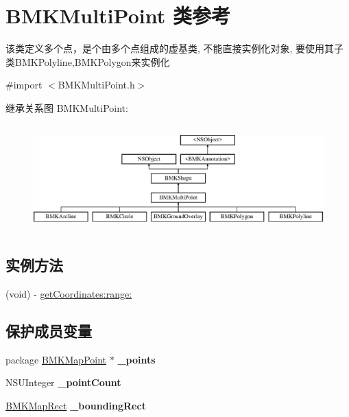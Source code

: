 \hypertarget{interface_b_m_k_multi_point}{\section{B\-M\-K\-Multi\-Point 类参考}
\label{interface_b_m_k_multi_point}
}


该类定义多个点，是个由多个点组成的虚基类, 不能直接实例化对象, 要使用其子类\-B\-M\-K\-Polyline,B\-M\-K\-Polygon来实例化  




{\ttfamily \#import $<$B\-M\-K\-Multi\-Point.\-h$>$}

继承关系图 B\-M\-K\-Multi\-Point\-:\begin{figure}[H]
\begin{center}
\leavevmode
\includegraphics[height=4.148148cm]{interface_b_m_k_multi_point}
\end{center}
\end{figure}
\subsection*{实例方法}
\begin{DoxyCompactItemize}
\item 
(void) -\/ \hyperlink{interface_b_m_k_multi_point_a5d7b000029db5c7efb2230ccb980bc29}{get\-Coordinates\-:range\-:}
\end{DoxyCompactItemize}
\subsection*{保护成员变量}
\begin{DoxyCompactItemize}
\item 
\hypertarget{interface_b_m_k_multi_point_a736d72334fd2ca7ae2108d9692d1107c}{package \hyperlink{struct_b_m_k_map_point}{B\-M\-K\-Map\-Point} $\ast$ {\bfseries \-\_\-points}}\label{interface_b_m_k_multi_point_a736d72334fd2ca7ae2108d9692d1107c}

\item 
\hypertarget{interface_b_m_k_multi_point_a8cc584110411ad5f72fc5068ae123a32}{N\-S\-U\-Integer {\bfseries \-\_\-point\-Count}}\label{interface_b_m_k_multi_point_a8cc584110411ad5f72fc5068ae123a32}

\item 
\hypertarget{interface_b_m_k_multi_point_a25b2435a2c10b3a22f6e7dc5bd064a52}{\hyperlink{struct_b_m_k_map_rect}{B\-M\-K\-Map\-Rect} {\bfseries \-\_\-bounding\-Rect}}\label{interface_b_m_k_multi_point_a25b2435a2c10b3a22f6e7dc5bd064a52}

\end{DoxyCompactItemize}
